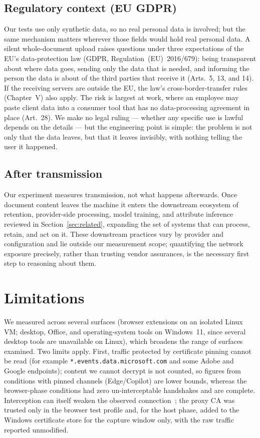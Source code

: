 \documentclass[sigconf,anonymous,review,balance=false]{acmart}
\begin{document}
\subsection{Regulatory context (EU GDPR)}
Our tests use only synthetic data, so no real personal data is involved; but the same
mechanism matters wherever those fields would hold real personal data. A silent
whole-document upload raises questions under three expectations of the EU's data-protection
law (GDPR, Regulation~(EU)~2016/679): being transparent about where data goes, sending only
the data that is needed, and informing the person the data is about of the third parties
that receive it (Arts.~5, 13, and 14). If the
receiving servers are outside the EU, the law's cross-border-transfer rules (Chapter~V) also
apply. The risk is largest at work, where an employee may paste client data into a consumer
tool that has no data-processing agreement in place (Art.~28). We make no legal ruling ---
whether any specific use is lawful depends on the details --- but the engineering point is
simple: the problem is not only that the data leaves, but that it leaves invisibly, with
nothing telling the user it happened.

\subsection{After transmission}
Our experiment measures transmission, not what
happens afterwards. Once document content leaves the machine it enters the downstream
ecosystem of retention, provider-side processing, model training, and attribute inference
reviewed in Section~\ref{sec:related}, expanding the set of systems that can process,
retain, and act on it. These downstream practices vary by provider and configuration and lie
outside our measurement scope; quantifying the network exposure precisely, rather than
trusting vendor assurances, is the necessary first step to reasoning about them.

\section{Limitations}
\label{sec:limitations}

We measured across several surfaces (browser extensions on an isolated Linux VM; desktop,
Office, and operating-system tools on Windows~11, since several desktop tools are unavailable
on Linux), which broadens the range of surfaces examined. Two limits apply. First, traffic
protected by certificate pinning cannot be read (for example
\texttt{*.events.data.microsoft.com} and some Adobe and Google endpoints); content we cannot
decrypt is not counted, so figures from conditions with pinned channels (Edge/Copilot) are
lower bounds, whereas the browser-phase conditions had zero un-interceptable handshakes and
are complete. Interception can itself weaken the observed
connection~\citep{durumeric2017https}; the proxy CA was trusted only in the browser test
profile and, for the host phase, added to the Windows certificate store for the capture
window only, with the raw traffic reported unmodified.
\end{document}
